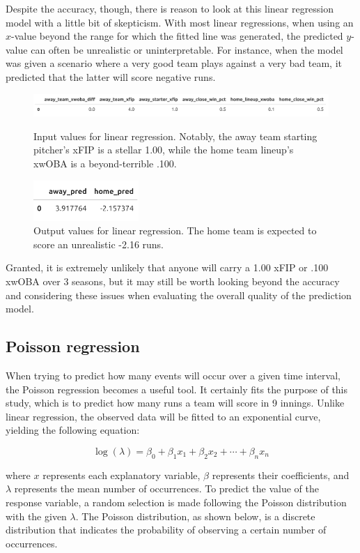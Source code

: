 \documentclass{paper}
\begin{document}
Despite the accuracy, though, there is reason to look at this linear regression model with a little bit of skepticism. With most linear regressions, when using an $x$-value beyond the range for which the fitted line was generated, the predicted $y$-value can often be unrealistic or uninterpretable. For instance, when the model was given a scenario where a very good team plays against a very bad team, it predicted that the latter will score negative runs.

\begin{figure}[H]
  \centering
  \includegraphics[width=13cm]{fig3}
  \caption{Input values for linear regression. Notably, the away team starting pitcher's xFIP is a stellar 1.00, while the home team lineup's xwOBA is a beyond-terrible .100.}
  \includegraphics[width=4cm]{fig4}
  \caption{Output values for linear regression. The home team is expected to score an unrealistic -2.16 runs.}
\end{figure}

Granted, it is extremely unlikely that anyone will carry a 1.00 xFIP or .100 xwOBA over 3 seasons, but it may still be worth looking beyond the accuracy and considering these issues when evaluating the overall quality of the prediction model.

\subsection{Poisson regression}
When trying to predict how many events will occur over a given time interval, the Poisson regression becomes a useful tool. It certainly fits the purpose of this study, which is to predict how many runs a team will score in 9 innings. Unlike linear regression, the observed data will be fitted to an exponential curve, yielding the following equation:

$$\log(\lambda)=\beta_0+\beta_1x_1+\beta_2x_2+\cdots+\beta_nx_n$$

where $x$ represents each explanatory variable, $\beta$ represents their coefficients, and $\lambda$ represents the mean number of occurrences. To predict the value of the response variable, a random selection is made following the Poisson distribution with the given $\lambda$. The Poisson distribution, as shown below, is a discrete distribution that indicates the probability of observing a certain number of occurrences.
\end{document}
